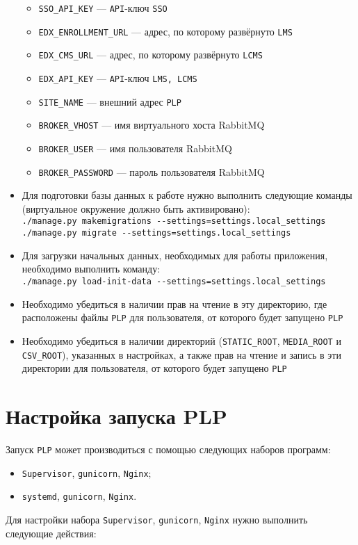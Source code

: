 \begin{itemize}
\begin{itemize}
		\item \texttt{SSO\_API\_KEY} --- \texttt{API}-ключ \texttt{SSO}
		\item \texttt{EDX\_ENROLLMENT\_URL} --- адрес, по которому развёрнуто \texttt{LMS}
		\item \texttt{EDX\_CMS\_URL} --- адрес, по которому развёрнуто \texttt{LCMS}
		\item \texttt{EDX\_API\_KEY} --- \texttt{API}-ключ \texttt{LMS, LCMS}
		\item \texttt{SITE\_NAME} --- внешний адрес \texttt{PLP}
		\item \texttt{BROKER\_VHOST} --- имя виртуального хоста RabbitMQ
		\item \texttt{BROKER\_USER} --- имя пользователя RabbitMQ
		\item \texttt{BROKER\_PASSWORD} --- пароль пользователя RabbitMQ
	\end{itemize}
	\item Для подготовки базы данных к работе нужно выполнить следующие команды (виртуальное окружение должно быть активировано):\\
		\texttt{./manage.py makemigrations -{}-settings=settings.local\_settings}\\
		\texttt{./manage.py migrate -{}-settings=settings.local\_settings}
	\item Для загрузки начальных данных, необходимых для работы приложения, необходимо выполнить команду:\\
		\texttt{./manage.py load-init-data -{}-settings=settings.local\_settings}
	\item Необходимо убедиться в наличии прав на чтение в эту директорию, где расположены файлы \texttt{PLP} для пользователя, от которого будет запущено \texttt{PLP}		
	\item Необходимо убедиться в наличии директорий (\texttt{STATIC\_ROOT}, \texttt{MEDIA\_ROOT} и \texttt{CSV\_ROOT}), указанных в настройках,
		а также прав на чтение и запись в эти директории для пользователя, от которого будет запущено \texttt{PLP}
\end{itemize}

\section{Настройка запуска PLP}
Запуск \texttt{PLP} может производиться с помощью следующих наборов программ: 
\begin{itemize}
	\item \texttt{Supervisor}, \texttt{gunicorn}, \texttt{Nginx};
	\item \texttt{systemd}, \texttt{gunicorn}, \texttt{Nginx}.
\end{itemize}
Для настройки набора \texttt{Supervisor}, \texttt{gunicorn}, \texttt{Nginx} нужно выполнить следующие действия:

